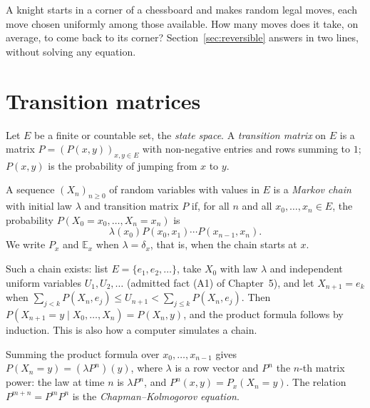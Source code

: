 \begin{think}
A knight starts in a corner of a chessboard and makes random legal moves, each move chosen uniformly among those
available. How many moves does it take, on average, to come back to its corner? Section~\ref{sec:reversible} answers in two
lines, without solving any equation.
\end{think}

\section{Transition matrices}

Let $E$ be a finite or countable set, the \emph{state space}. A \emph{transition matrix} on $E$ is a matrix $P=(P(x,y))_{x,y\in E}$ with non-negative
entries and rows summing to $1$; $P(x,y)$ is the probability of jumping from $x$ to $y$.

\begin{definition}\label{def:markov}
A sequence $(X_n)_{n\ge0}$ of random variables with values in $E$ is a \emph{Markov chain} with initial law $\lambda$ and transition matrix
$P$ if, for all $n$ and all $x_0,\dots,x_n\in E$, the probability $P(X_0=x_0,\dots,X_n=x_n)$ is
\[
\lambda(x_0)P(x_0,x_1)\cdots P(x_{n-1},x_n).
\]
We write $P_x$ and $\mathbb E_x$ when $\lambda=\delta_x$, that is, when the chain starts at $x$.
\end{definition}

Such a chain exists: list $E=\{e_1,e_2,\ldots\}$, take $X_0$ with law $\lambda$ and independent uniform variables $U_1,U_2,\ldots$ (admitted fact (A1)
of Chapter~5), and let $X_{n+1}=e_k$ when $\sum_{j<k}P(X_n,e_j)\le U_{n+1}<\sum_{j\le k}P(X_n,e_j)$. Then $P(X_{n+1}=y\mid X_0,\dots,X_n)=P(X_n,y)$, and the product
formula follows by induction. This is also how a computer simulates a chain.

Summing the product formula over $x_0,\dots,x_{n-1}$ gives $P(X_n=y)=(\lambda P^n)(y)$, where $\lambda$ is a row vector and $P^n$ the $n$-th matrix power:
the law at time $n$ is $\lambda P^n$, and $P^n(x,y)=P_x(X_n=y)$. The relation $P^{m+n}=P^mP^n$ is the \emph{Chapman--Kolmogorov equation}.

